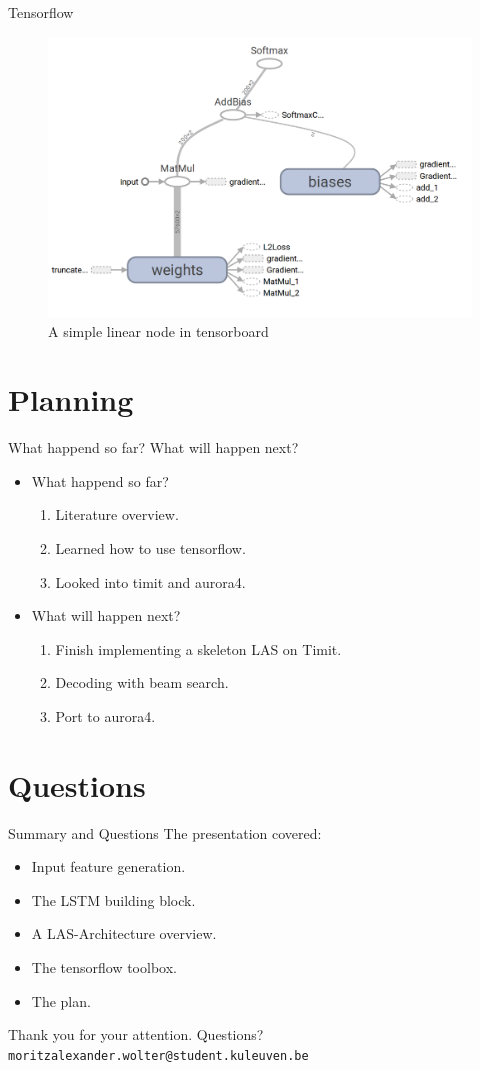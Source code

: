 \documentclass{beamer}
\begin{document}
\begin{frame}{Tensorflow}
\begin{figure}
\centering
\includegraphics[width=0.7\linewidth]{../png/net1}
\caption{A simple linear node in tensorboard}
\label{fig:net1}
\end{figure}
\end{frame}

\section{Planning}
\begin{frame}{What happend so far? What will happen next?}
\begin{itemize}
\item What happend so far?
	\begin{enumerate}
		\item Literature overview.
		\item Learned how to use tensorflow.
		\item Looked into timit and aurora4.
	\end{enumerate}
\item What will happen next?
		\begin{enumerate}
			\item Finish implementing a skeleton LAS on Timit. 
			\item Decoding with beam search.
			\item Port to aurora4.
		\end{enumerate}
\end{itemize}
\end{frame}


\section{Questions}
\begin{frame}{Summary and Questions}
	The presentation covered:
	\begin{itemize}
		\item Input feature generation.
		\item The LSTM building block.
		\item A LAS-Architecture overview.
		\item The tensorflow toolbox.
		\item The plan.
	\end{itemize}
	Thank you for your attention. Questions? \\
	\texttt{moritzalexander.wolter@student.kuleuven.be}
\end{frame}
\end{document}
